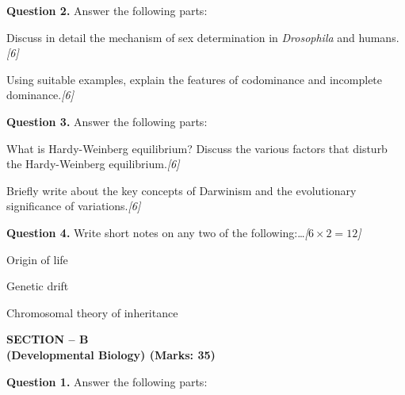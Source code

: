 \documentclass[11pt,a4paper]{article}
\newcommand{\pts}[1]{\hfill   \textit{[#1]}}
\begin{document}
\medskip


\noindent   \textbf{Question 2.} Answer the following parts:

\begin{parts}
  \item Discuss in detail the mechanism of sex determination in   \textit{Drosophila} and humans.\pts{6}
  \item Using suitable examples, explain the features of codominance and incomplete dominance.\pts{6}
\end{parts}

\medskip


\noindent   \textbf{Question 3.} Answer the following parts:

\begin{parts}
  \item What is Hardy-Weinberg equilibrium? Discuss the various factors that disturb the Hardy-Weinberg equilibrium.\pts{6}
  \item Briefly write about the key concepts of Darwinism and the evolutionary significance of variations.\pts{6}
\end{parts}

\medskip


\noindent   \textbf{Question 4.} Write short notes on any two of the following:\dots\pts{$6  \times 2 = 12$}

\begin{parts}
  \item Origin of life
  \item Genetic drift
  \item Chromosomal theory of inheritance
\end{parts}

\pagebreak

\begin{center}
   \textbf{SECTION -- B} \\
   \textbf{(Developmental Biology) (Marks: 35)}
\end{center}

\medskip


\noindent   \textbf{Question 1.} Answer the following parts:
\end{document}
